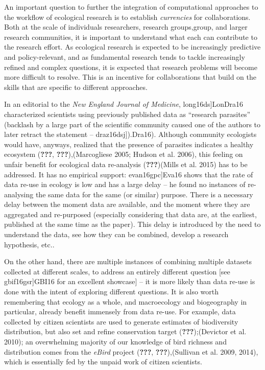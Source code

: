 \documentclass[11pt,serif]{article}
\begin{document}
An important question to further the integration of computational
approaches to the workflow of ecological research is to establish
\emph{currencies} for collaborations. Both at the scale of individuals
researchers, research
\color{gray}groups,\color{black}\color{purple}group,\color{black} and
larger research communities, it is important to understand what each can
contribute to the research effort. As ecological research is expected to
be increasingly predictive and policy-relevant, and as fundamental
research tends to tackle increasingly refined and complex questions, it
is expected that research problems will become more difficult to
resolve. This is an incentive for collaborations that build on the
skills that are specific to different approaches.

In an editorial to the \emph{New England Journal of Medicine},
\color{gray}{[}long16ds{]}\color{black}\color{purple}LonDra16\color{black}
characterized scientists using previously published data as ``research
parasites'' (backlash by a large part of the scientific community caused
one of the authors to later retract the statement --
\color{gray}{[}draz16dsj{]}).\color{black}\color{purple}Dra16).\color{black}
Although community ecologists would have, anyways, realized that the
presence of parasites indicates a healthy ecosystem
\color{gray}({\textbf{???}},
{\textbf{???}}),\color{black}\color{purple}(Marcogliese 2005; Hudson et
al. 2006),\color{black} this feeling on unfair benefit for ecological
data re-analysis
\color{gray}({\textbf{???}})\color{black}\color{purple}(Mills et al.
2015)\color{black} has to be addressed. It has no empirical support:
\color{gray}{[}evan16gpc{]}\color{black}\color{purple}Eva16\color{black}
shows that the rate of data re-use in ecology is low and has a large
delay -- he found no instances of re-analysing the same data for the
same (or similar) purpose. There is a necessary delay between the moment
data are available, and the moment where they are aggregated and
re-purposed (especially considering that data are, at the earliest,
published at the same time as the paper). This delay is introduced by
the need to understand the data, see how they can be combined, develop a
research hypothesis, etc..

On the other hand, there are multiple instances of combining multiple
datasets collected at different scales, to address an entirely different
question {[}see
\color{gray}{[}gbif16gsr{]}\color{black}\color{purple}GBI16\color{black}
for an excellent showcase{]} -- it is more likely than data re-use is
done with the intent of exploring different questions. It is also worth
remembering that ecology as a whole, and macroecology and biogeography
in particular, already benefit immensely from data re-use. For example,
data collected by citizen scientists are used to generate estimates of
biodiversity distribution, but also set and refine conservation target
\color{gray}({\textbf{???}});\color{black}\color{purple}(Devictor et al.
2010);\color{black} an overwhelming majority of our knowledge of bird
richness and distribution comes from the \emph{eBird} project
\color{gray}({\textbf{???}},
{\textbf{???}}),\color{black}\color{purple}(Sullivan et al. 2009,
2014),\color{black} which is essentially fed by the unpaid work of
citizen scientists.
\end{document}
